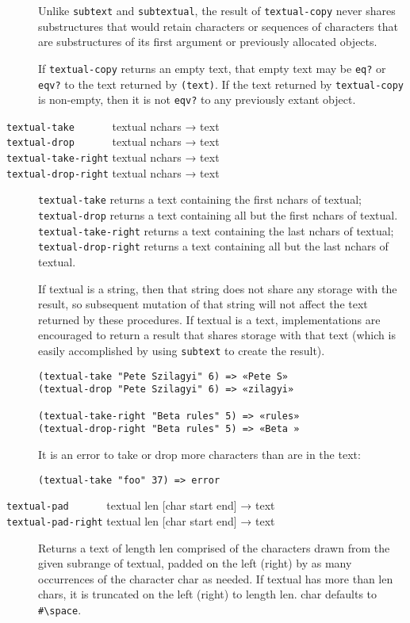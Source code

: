 \begin{description}
Unlike \texttt{subtext} and \texttt{subtextual}, the result of
\texttt{textual-copy} never shares substructures that would retain
characters or sequences of characters that are substructures of its
first argument or previously allocated objects.

If \texttt{textual-copy} returns an empty text, that empty text may be
\texttt{eq?} or \texttt{eqv?} to the text returned by \texttt{(text)}.
If the text returned by \texttt{textual-copy} is non-empty, then it is
not \texttt{eqv?} to any previously extant object.
\item[ \href{}{} \href{}{} \href{}{} \href{}{}
\texttt{textual-take~~~~~~} textual nchars → text\\
\texttt{textual-drop~~~~~~} textual nchars → text\\
\texttt{textual-take-right} textual nchars → text\\
\texttt{textual-drop-right} textual nchars → text ]
\texttt{textual-take} returns a text containing the first nchars of
textual; \texttt{textual-drop} returns a text containing all but the
first nchars of textual. \texttt{textual-take-right} returns a text
containing the last nchars of textual; \texttt{textual-drop-right}
returns a text containing all but the last nchars of textual.

If textual is a string, then that string does not share any storage with
the result, so subsequent mutation of that string will not affect the
text returned by these procedures. If textual is a text, implementations
are encouraged to return a result that shares storage with that text
(which is easily accomplished by using \texttt{subtext} to create the
result).

\begin{verbatim}
(textual-take "Pete Szilagyi" 6) => «Pete S»
(textual-drop "Pete Szilagyi" 6) => «zilagyi»

(textual-take-right "Beta rules" 5) => «rules»
(textual-drop-right "Beta rules" 5) => «Beta »
\end{verbatim}

It is an error to take or drop more characters than are in the text:

\begin{verbatim}
(textual-take "foo" 37) => error
\end{verbatim}
\item[ \href{}{} \href{}{} \texttt{textual-pad~~~~~~} textual len
{[}char start end{]} → text\\
\texttt{textual-pad-right} textual len {[}char start end{]} → text ]
Returns a text of length len comprised of the characters drawn from the
given subrange of textual, padded on the left (right) by as many
occurrences of the character char as needed. If textual has more than
len chars, it is truncated on the left (right) to length len. char
defaults to \texttt{\#\textbackslash{}space}.


\end{description}
